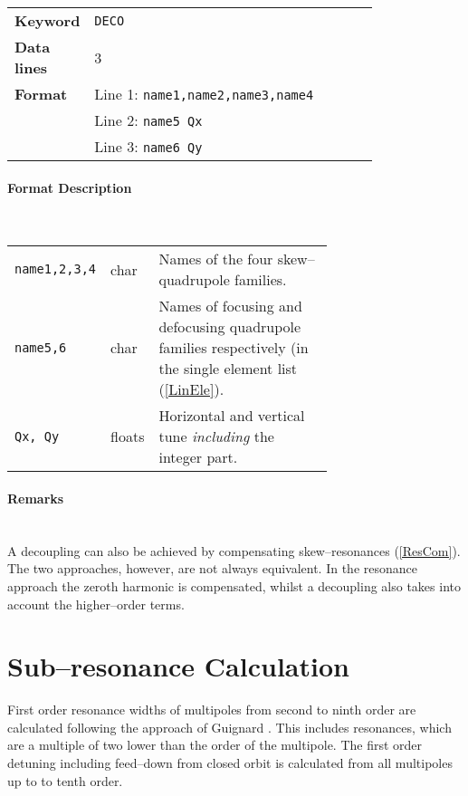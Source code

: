 \bigskip
\begin{tabular}{@{}lp{0.8\linewidth}}
    \textbf{Keyword}    & \texttt{DECO} \\
    \textbf{Data lines} & 3 \\
    \textbf{Format}     & Line 1: \texttt{name1,name2,name3,name4} \\
                        & Line 2: \texttt{name5 Qx} \\
                        & Line 3: \texttt{name6 Qy}
\end{tabular}

\paragraph{Format Description}~

\bigskip
\begin{tabular}{@{}llp{0.70\linewidth}}
    \texttt{name1,2,3,4} & char   & Names of the four skew--quadrupole families. \\
    \texttt{name5,6}     & char   & Names of focusing and defocusing quadrupole families respectively (in the single element list (\ref{LinEle}). \\
    \texttt{Qx, Qy}      & floats & Horizontal and vertical tune \emph{including} the integer part.
\end{tabular}

\paragraph{Remarks}~\\

A decoupling can also be achieved by compensating skew--resonances (\ref{ResCom}).
The two approaches, however, are not always equivalent.
In the resonance approach the zeroth harmonic is compensated, whilst a decoupling also takes into account the higher--order terms.

\section{Sub--resonance Calculation} \label{SubCal}

First order resonance widths of multipoles from second to ninth order are calculated following the approach of Guignard \cite{Gilbert78}.
This includes resonances, which are a multiple of two lower than the order of the multipole.
The first order detuning including feed--down from closed orbit is calculated from all multipoles up to to tenth order.

